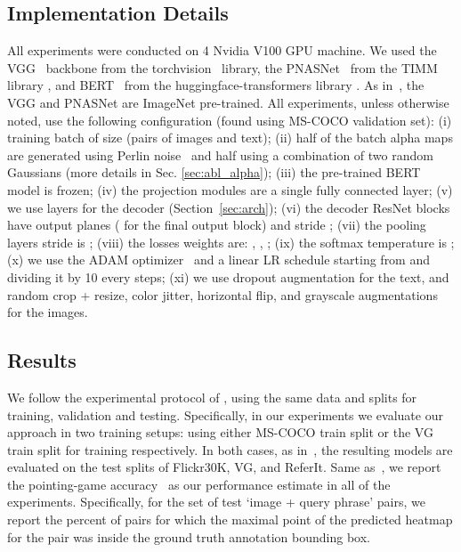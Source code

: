 \documentclass[10pt,twocolumn,letterpaper]{article}
\newcommand\secvspace{\vspace{-0.0cm}}
\begin{document}
\subsection{Implementation Details}\label{sec:impl_details}
\secvspace
All experiments were conducted on 4 Nvidia V100 GPU machine. We used the VGG~\cite{simonyan2014very} backbone from the torchvision~\cite{marcel2010torchvision} library, the PNASNet~\cite{liu2018progressive} from the TIMM library \cite{rw2019timm}, and BERT~\cite{devlin2018bert} from the huggingface-transformers library \cite{wolf-etal-2020-transformers}.
As in~\cite{akbari2019multi}, the VGG and PNASNet are ImageNet pre-trained.
All experiments, unless otherwise noted, use the following configuration (found using MS-COCO validation set):
(i) training batch of size  (pairs of images and text); 
(ii) half of the batch alpha maps are generated using Perlin noise~\cite{perlin1985image} and half using a combination of two random Gaussians (more details in Sec. \ref{sec:abl_alpha});
(iii) the pre-trained BERT model is frozen;
(iv) the projection modules  are a single fully connected layer;
(v) we use  layers for the decoder  (Section~\ref{sec:arch}); 
(vi) the decoder ResNet blocks  have  output planes ( for the final output block) and stride ;
(vii) the pooling layers stride is ; 
(viii) the losses weights are: , , ; 
(ix) the softmax temperature is ;
(x) we use the ADAM optimizer~\cite{kingma2014adam} and a linear LR schedule starting from  and dividing it by 10 every  steps; 
(xi) we use  dropout augmentation for the text, and random crop +  resize, color jitter, horizontal flip, and grayscale augmentations for the images. 


 \secvspace
\subsection{Results}\label{sec:results}
\secvspace
We follow the experimental protocol of \cite{akbari2019multi}, using the same data and splits for training, validation and testing. Specifically, in our experiments we evaluate our approach in two training setups: using either MS-COCO train split or the VG train split for training respectively. In both cases, as in~\cite{akbari2019multi}, the resulting models are evaluated on the test splits of Flickr30K, VG, and ReferIt. Same as~\cite{akbari2019multi}, we report the pointing-game accuracy~\cite{zhang2016top} as our performance estimate in all of the experiments. Specifically, for the set of test `image + query phrase' pairs, we report the percent of pairs for which the maximal point of the predicted heatmap for the pair was inside the ground truth annotation bounding box.
\end{document}
